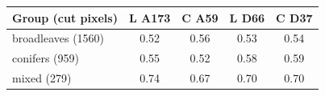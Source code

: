 \begin{tabular}{lcccc}
\toprule
Group (cut pixels) & L A173 & C A59 & L D66 & C D37 \\
\midrule
broadleaves (1560) & 0.52 & 0.56 & 0.53 & 0.54 \\
conifers (959) & 0.55 & 0.52 & 0.58 & 0.59 \\
mixed (279) & 0.74 & 0.67 & 0.70 & 0.70 \\
\bottomrule
\end{tabular}
